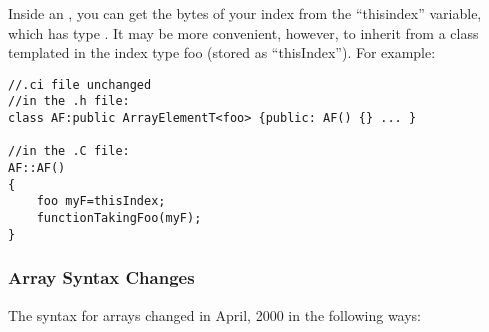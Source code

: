 Inside an , you can get the bytes of your index
from the ``thisindex'' variable, which has type .  
It may be more convenient, however, to inherit from  a 
class templated in the index type foo (stored as ``thisIndex'').
For example:

\begin{verbatim}
//.ci file unchanged
//in the .h file:
class AF:public ArrayElementT<foo> {public: AF() {} ... }

//in the .C file:
AF::AF()
{
    foo myF=thisIndex;
    functionTakingFoo(myF);
}
\end{verbatim}


\subsubsection{Array Syntax Changes}
The syntax for arrays changed in April, 2000 in the following ways:

